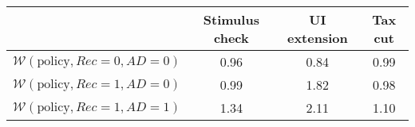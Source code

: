 \begin{tabular}{@{}lccc@{}} 
\toprule 
                          & Stimulus check      & UI extension    & Tax cut    \\  \midrule 
$\mathcal{W}(\text{policy}, Rec=0, AD=0)$ & 0.96  & 0.84  & 0.99     \\ 
$\mathcal{W}(\text{policy}, Rec=1, AD=0)$ & 0.99  & 1.82  & 0.98     \\ 
$\mathcal{W}(\text{policy}, Rec=1, AD=1)$ & 1.34  & 2.11  & 1.10     \\ 
\end{tabular}  
